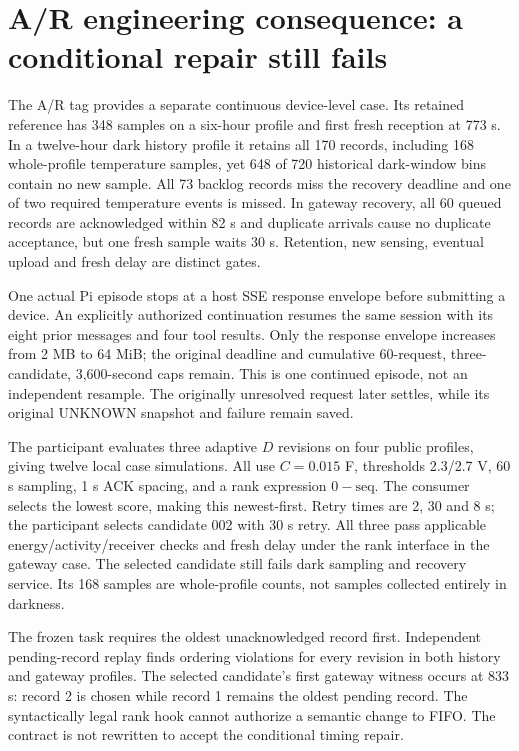 \section{A/R engineering consequence: a conditional repair still fails}
\label{sec:ar}
The A/R tag provides a separate continuous device-level case. Its retained
reference has 348 samples on a six-hour profile and first fresh reception at
773 s. In a twelve-hour dark history profile it retains all 170 records,
including 168 whole-profile temperature samples, yet 648 of 720 historical
dark-window bins contain no new sample. All 73 backlog records miss the
recovery deadline and one of two required temperature events is missed.
In gateway recovery, all 60 queued records are acknowledged within 82 s and
duplicate arrivals cause no duplicate acceptance, but one fresh sample waits
30 s. Retention, new sensing, eventual upload and fresh delay are distinct gates.

One actual Pi episode stops at a host SSE response envelope before submitting
a device. An explicitly authorized continuation resumes the same session with
its eight prior messages and four tool results. Only the response envelope
increases from 2 MB to 64 MiB; the original deadline and cumulative 60-request,
three-candidate, 3,600-second caps remain. This is one continued episode, not
an independent resample. The originally unresolved request later settles,
while its original UNKNOWN snapshot and failure remain saved.

The participant evaluates three adaptive $D$ revisions on four public profiles,
giving twelve local case simulations. All use $C=0.015$ F, thresholds 2.3/2.7 V,
60 s sampling, 1 s ACK spacing, and a rank expression $0-\mathrm{seq}$.
The consumer selects the lowest score, making this newest-first. Retry times
are 2, 30 and 8 s; the participant selects candidate 002 with 30 s retry.
All three pass applicable energy/activity/receiver checks and fresh delay
under the rank interface in the gateway case. The selected candidate still
fails dark sampling and recovery service. Its 168 samples are whole-profile
counts, not samples collected entirely in darkness.



The frozen task requires the oldest unacknowledged record first. Independent
pending-record replay finds ordering violations for every revision in both
history and gateway profiles. The selected candidate's first gateway witness
occurs at 833 s: record 2 is chosen while record 1 remains the oldest pending
record. The syntactically legal rank hook cannot authorize a semantic change
to FIFO. The contract is not rewritten to accept the conditional timing repair.

